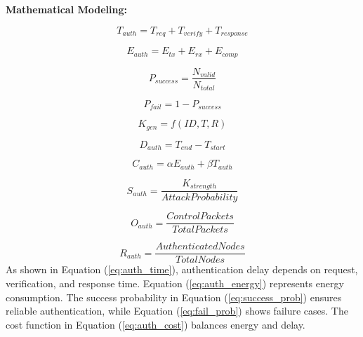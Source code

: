 \documentclass[a4paper,fleqn]{cas-dc}
\numberwithin{equation}{section}
\begin{document}
\textbf{Mathematical Modeling:}

\begin{equation}
T_{auth} = T_{req} + T_{verify} + T_{response}
\label{eq:auth_time}
\end{equation}

\begin{equation}
E_{auth} = E_{tx} + E_{rx} + E_{comp}
\label{eq:auth_energy}
\end{equation}

\begin{equation}
P_{success} = \frac{N_{valid}}{N_{total}}
\label{eq:success_prob}
\end{equation}

\begin{equation}
P_{fail} = 1 - P_{success}
\label{eq:fail_prob}
\end{equation}

\begin{equation}
K_{gen} = f(ID,T,R)
\label{eq:key}
\end{equation}

\begin{equation}
D_{auth} = T_{end} - T_{start}
\label{eq:delay_auth}
\end{equation}

\begin{equation}
C_{auth} = \alpha E_{auth} + \beta T_{auth}
\label{eq:auth_cost}
\end{equation}

\begin{equation}
S_{auth} = \frac{K_{strength}}{AttackProbability}
\label{eq:auth_security}
\end{equation}

\begin{equation}
O_{auth} = \frac{ControlPackets}{TotalPackets}
\label{eq:auth_overhead}
\end{equation}

\begin{equation}
R_{auth} = \frac{AuthenticatedNodes}{TotalNodes}
\label{eq:auth_ratio}
\end{equation}
As shown in Equation (\ref{eq:auth_time}), authentication delay depends on request, verification, and response time. Equation (\ref{eq:auth_energy}) represents energy consumption. The success probability in Equation (\ref{eq:success_prob}) ensures reliable authentication, while Equation (\ref{eq:fail_prob}) shows failure cases. The cost function in Equation (\ref{eq:auth_cost}) balances energy and delay.
\end{document}
